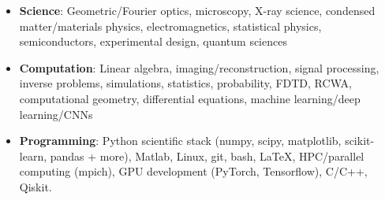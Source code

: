 \begin{itemize}
    \item \textbf{Science}: Geometric/Fourier optics, microscopy, X-ray science, condensed matter/materials physics, electromagnetics, statistical physics, semiconductors, experimental design, quantum sciences \par
    \item \textbf{Computation}: Linear algebra, imaging/reconstruction, signal processing, inverse problems, simulations, statistics, probability, FDTD, RCWA, computational geometry, differential equations, machine learning/deep learning/CNNs \par
    \item \textbf{Programming}: Python scientific stack (numpy, scipy, matplotlib, scikit-learn, pandas + more), Matlab, Linux, git, bash, \LaTeX, HPC/parallel computing (mpich), GPU development (PyTorch, Tensorflow), C/C++, Qiskit.
\end{itemize}
